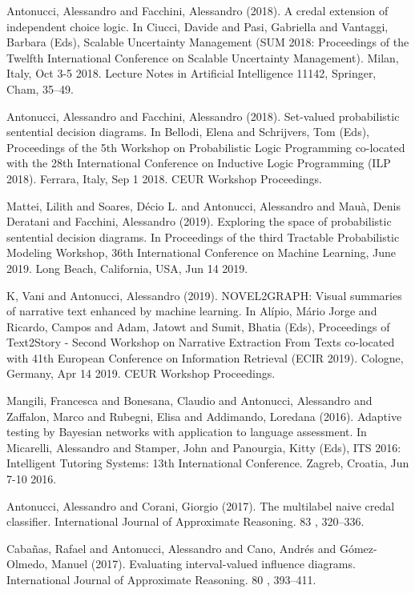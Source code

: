 \begin{cventries}
\begin{cvitems}
\item Antonucci, Alessandro and Facchini, Alessandro (2018).   A credal extension of independent choice logic.   In Ciucci, Davide and Pasi, Gabriella and Vantaggi, Barbara (Eds), Scalable Uncertainty Management (SUM 2018: Proceedings of the Twelfth International Conference on Scalable Uncertainty Management).   Milan, Italy, Oct 3-5 2018.   Lecture Notes in Artificial Intelligence 11142, Springer, Cham, 35–49.
\item Antonucci, Alessandro and Facchini, Alessandro (2018).   Set-valued probabilistic sentential decision diagrams.   In Bellodi, Elena and Schrijvers, Tom (Eds), Proceedings of the 5th Workshop on Probabilistic Logic Programming co-located with the 28th International Conference on Inductive Logic Programming (ILP 2018).   Ferrara, Italy,   Sep 1 2018.   CEUR Workshop Proceedings.
\item Mattei, Lilith and Soares, Décio L. and Antonucci, Alessandro and Mauà, Denis Deratani and Facchini, Alessandro (2019).   Exploring the space of probabilistic sentential decision diagrams.   In Proceedings of the third Tractable Probabilistic Modeling Workshop, 36th International Conference on Machine Learning, June 2019.   Long Beach, California, USA,   Jun 14 2019.
\item K, Vani and Antonucci, Alessandro (2019).   NOVEL2GRAPH: Visual summaries of narrative text enhanced by machine learning.   In Alípio, Mário Jorge and Ricardo, Campos and Adam, Jatowt and Sumit, Bhatia (Eds), Proceedings of Text2Story - Second Workshop on Narrative Extraction From Texts co-located with 41th European Conference on Information Retrieval (ECIR 2019).   Cologne, Germany,   Apr 14 2019.   CEUR Workshop Proceedings.
\item Mangili, Francesca and Bonesana, Claudio and Antonucci, Alessandro and Zaffalon, Marco and Rubegni, Elisa and Addimando, Loredana (2016).   Adaptive testing by Bayesian networks with application to language assessment.   In Micarelli, Alessandro and Stamper, John and Panourgia, Kitty (Eds), ITS 2016: Intelligent Tutoring Systems: 13th International Conference.   Zagreb, Croatia,   Jun 7-10 2016.
\item Antonucci, Alessandro and Corani, Giorgio (2017).   The multilabel naive credal classifier.   International Journal of Approximate Reasoning. 83 , 320–336.
\item Cabañas, Rafael and Antonucci, Alessandro and Cano, Andrés and Gómez-Olmedo, Manuel (2017).   Evaluating interval-valued influence diagrams.   International Journal of Approximate Reasoning. 80 , 393–411.

\end{cvitems}
\end{cventries}
